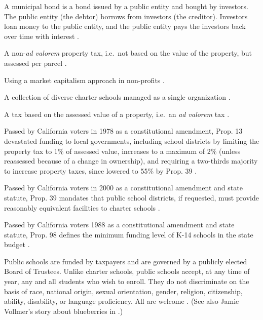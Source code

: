\begin{description}[nosep]
  \medskip\item[municipal bond] A municipal bond is a bond issued by a public entity and bought by investors. The public entity (the debtor) borrows from investors (the creditor). Investors loan money to the public entity, and the public entity pays the investors back over time with interest \parencite{Chen2022}.

  \medskip\item[parcel tax] A non-\textit{ad valorem} property tax, i.e.~not based on the value of the property, but assessed per parcel \parencite{Lu2019}.

  \medskip\item[philanthrocapitalism] Using a market capitalism approach in non-profits \parencite{Giridharadas2018}.

  \medskip\item[portfolio school district] A collection of diverse charter schools managed as a single organization \parencite{Lake.Hernandez2011}.

  \medskip\item[property tax] A tax based on the assessed value of a property, i.e.~an \textit{ad valorem} tax \parencite{BOE2018}.

  \medskip\item[Proposition 13] Passed by California voters in 1978 as a constitutional amendment, Prop. 13 devastated funding to local governments, including school districts by limiting the property tax to 1\% of assessed value, increases to a maximum of 2\% (unless reassessed because of a change in ownership), and requiring a two-thirds majority to increase property taxes, since lowered to 55\% by Prop. 39 \parencite{Aguinaldo.etal2022}.

  \medskip\item[Proposition 39] Passed by California voters in 2000 as a constitutional amendment and state statute, Prop. 39 mandates that public school districts, if requested, must provide reasonably equivalent facilities to charter schools \parencite{Aguinaldo.etal2022}.

  \medskip\item[Proposition 98] Passed by California voters 1988 as a constitutional amendment and state statute, Prop. 98 defines the minimum funding level of K-14 schools in the state budget \parencite{Aguinaldo.etal2022}.

  \medskip\item[public school] Public schools are funded by taxpayers and are governed by a publicly elected Board of Trustees. Unlike charter schools, public schools accept, at any time of year, any and all students who wish to enroll. They do not discriminate on the basis of race, national origin, sexual orientation, gender, religion, citizenship, ability, disability, or language proficiency. All are welcome \parencite{CDE2023b}. (See also Jamie Vollmer's story about blueberries in \textcite{Vollmer2011}.)


\end{description}
